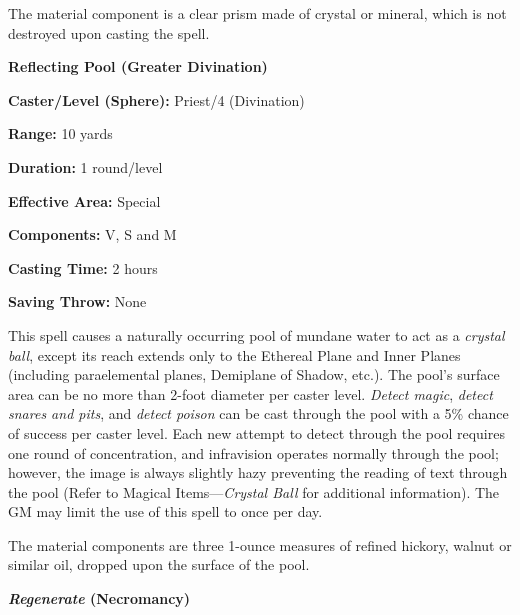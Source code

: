 \begin{multicols}{2}
The material component is a clear prism made of crystal or mineral, which is not destroyed upon casting the spell.



\vspace{1em}

\noindent
\begin{minipage}{\columnwidth}

\noindent \textbf{Reflecting Pool (Greater Divination)}

\noindent \textbf{Caster/Level (Sphere):} Priest/4 (Divination)

\noindent \textbf{Range:} 10 yards

\noindent \textbf{Duration:} 1 round/level

\noindent \textbf{Effective Area:} Special

\noindent \textbf{Components:} V, S and M

\noindent \textbf{Casting Time:} 2 hours

\noindent \textbf{Saving Throw:} None

\end{minipage}

This spell causes a naturally occurring pool of mundane water to act as a \textit{crystal ball}, except its reach extends only to the Ethereal Plane and Inner Planes (including paraelemental planes, Demiplane of Shadow, etc.).  The pool's surface area can be no more than 2-foot diameter per caster level.  \textit{Detect magic}, \textit{detect snares and pits}, and \textit{detect poison} can be cast through the pool with a 5\% chance of success per caster level.  Each new attempt to detect through the pool requires one round of concentration, and infravision operates normally through the pool; however, the image is always slightly hazy preventing the reading of text through the pool (Refer to Magical Items---\textit{Crystal Ball} for additional information).  The GM may limit the use of this spell to once per day.

The material components are three 1-ounce measures of refined hickory, walnut or similar oil, dropped upon the surface of the pool.

\vspace{1em}

\noindent
\begin{minipage}{\columnwidth}

\noindent \textbf{\textit{Regenerate} (Necromancy)}


\end{minipage}
\end{multicols}
